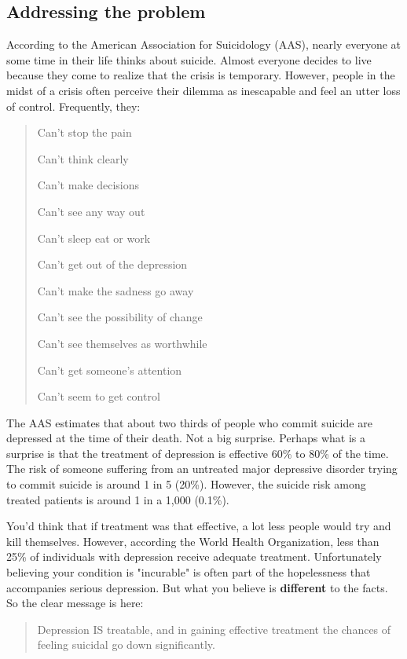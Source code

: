 \documentclass[12pt]{article}
\begin{document}
\subsection{Addressing the problem}

According to the American Association for Suicidology (AAS), nearly everyone at some time in their life thinks about suicide. Almost everyone decides to live because they come to realize that the crisis is temporary. However, people in the midst of a crisis often perceive their dilemma as inescapable and feel an utter loss of control. Frequently, they:

\begin{verse}

Can't stop the pain

Can't think clearly

Can't make decisions

Can't see any way out

Can't sleep eat or work

Can't get out of the depression

Can't make the sadness go away

Can't see the possibility of change

Can't see themselves as worthwhile

Can't get someone's attention

Can't seem to get control

\end{verse}

The AAS estimates that about two thirds of people who commit suicide are depressed at the time of their death. Not a big surprise. Perhaps what is a surprise is that the treatment of depression is effective 60\% to 80\% of the time. The risk of someone suffering from an untreated major depressive disorder trying to commit suicide is around 1 in 5 (20\%). However, the suicide risk among treated patients is around 1 in a 1,000 (0.1\%).

You'd think that if treatment was that effective, a lot less people would try and kill themselves. However, according the World Health Organization, less than 25\% of individuals with depression receive adequate treatment. Unfortunately believing your condition is "incurable" is often part of the hopelessness that accompanies serious depression. But what you believe is \textbf{different} to the facts. So the clear message is here:

\begin{quote}

Depression IS treatable, and in gaining effective treatment the chances of feeling suicidal go down significantly.

\end{quote}
\end{document}
